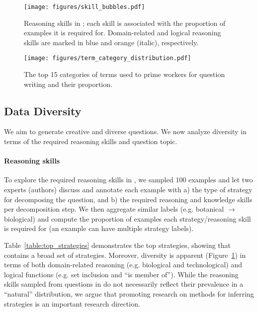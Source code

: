 {\begin{figure}[t]
    \centering
    \texttt{[image: figures/skill\_bubbles.pdf]}
    \caption{Reasoning skills in \strategyqa{}; each skill is associated with the proportion of examples it is required for. Domain-related and logical reasoning skills are marked in blue and orange (italic), respectively.}
    \label{figure:reasoning_skills}
\end{figure}

\begin{figure}[t]
    \centering
    \texttt{[image: figures/term\_category\_distribution.pdf]}
    \caption{The top 15 categories of terms used to prime workers for question writing and their proportion.}
    \label{figure:term_categories}
\end{figure}

\subsection{Data Diversity}
\label{subsec:data_diversity}
We aim to generate creative and diverse questions. We now analyze diversity in terms of the required reasoning skills and question topic.

\paragraph{Reasoning skills}
To explore the required reasoning skills in \strategyqa{}, we sampled 100 examples and let two experts (authors) discuss and annotate each example with a) the type of strategy for decomposing the question, and b) the required reasoning and knowledge skills per decomposition step. We then aggregate similar labels (e.g. botanical $\rightarrow$ biological) and compute the proportion of examples each strategy/reasoning skill is required for (an example can have multiple strategy labels).

Table~\ref{table:top_strategies} demonstrates the top strategies, showing that \strategyqa{} contains a broad set of strategies.
Moreover,  diversity is apparent (Figure~\ref{figure:reasoning_skills}) in terms of both domain-related reasoning (e.g. biological and technological) and logical functions (e.g. set inclusion and ``is member of''). 
While the reasoning skills sampled from questions in \strategyqa{} do not necessarily reflect their prevalence in a ``natural'' distribution, we argue that promoting research on methods for inferring strategies is an important research direction.

}
